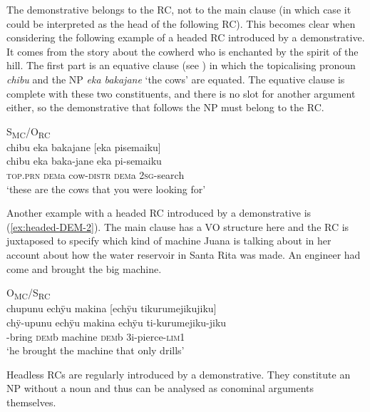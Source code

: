 The demonstrative belongs to the RC, not to the main clause (in which case it could be interpreted as the head  of the following RC). This becomes clear when considering the following example of a headed RC introduced by a demonstrative. It comes from the story about the cowherd who is enchanted by the spirit of the hill. The first part is an equative clause (see ) in which the topicalising pronoun \textit{chibu} and the NP \textit{eka bakajane} ‘the cows’ are equated. The equative clause is complete with these two constituents, and there is no slot for another argument either, so the demonstrative that follows the NP must belong to the RC.


\ea\label{ex:headed-DEM}
\begingl
\glpreamble \textup{S\textsubscript{MC}/O\textsubscript{RC}}\\chibu eka bakajane \textup{[}eka pisemaiku\textup{]}\\
\gla chibu eka baka-jane eka pi-semaiku\\
\textsc{top.prn} \textsc{dem}a cow-\textsc{distr} \textsc{dem}a 2\textsc{sg}-search\\
\glft ‘these are the cows that you were looking for’
\endgl
\trailingcitation{[mxx-n151017l-1.44]}
\xe

Another example with a headed RC introduced by a demonstrative is (\ref{ex:headed-DEM-2}). The main clause has a VO structure here and the RC is juxtaposed to specify which kind of machine Juana is talking about in her account about how the water reservoir in Santa Rita was made. An engineer had come and brought the big machine.

\ea\label{ex:headed-DEM-2}
\begingl
\glpreamble \textup{O\textsubscript{MC}/S\textsubscript{RC}}\\chupunu echÿu makina \textup{[}echÿu tikurumejikujiku\textup{]}\\
\gla chÿ-upunu echÿu makina echÿu ti-kurumejiku-jiku\\
-bring \textsc{dem}b machine \textsc{dem}b 3i-pierce-\textsc{lim}1\\
\glft ‘he brought the machine that only drills’
\endgl
\trailingcitation{[jxx-p120515l-2.215]}
\xe


Headless RCs are regularly introduced by a demonstrative. They constitute an NP without a noun and thus can be analysed as conominal arguments themselves. 


